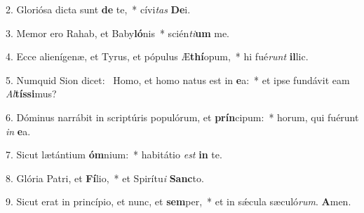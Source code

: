 2. Gloriósa dicta sunt \textbf{de} te,~*  cívi\textit{tas} \textbf{De}i.\

3. Memor ero Rahab, et Baby\textbf{ló}nis~*  scién\textit{ti}\textbf{um} me.\

4. Ecce alienígenæ, et Tyrus, et pópulus Æ\textbf{thí}opum,~*  hi fué\textit{runt} \textbf{il}lic.\

5. Numquid Sion dicet: \dag\  Homo, et homo natus est in \textbf{e}a:~*  et ipse fundávit eam \textit{Al}\textbf{tís}\textbf{si}mus?\

6. Dóminus narrábit in scriptúris populórum, et \textbf{prín}cipum:~*  horum, qui fuérunt \textit{in} \textbf{e}a.\

7. Sicut lætántium \textbf{óm}nium:~*  habitátio \textit{est} \textbf{in} te.\

8. Glória Patri, et \textbf{Fí}lio,~*  et Spirítu\textit{i} \textbf{Sanc}to.\

9. Sicut erat in princípio, et nunc, et \textbf{sem}per,~*  et in sǽcula sæculó\textit{rum}. \textbf{A}men.\

